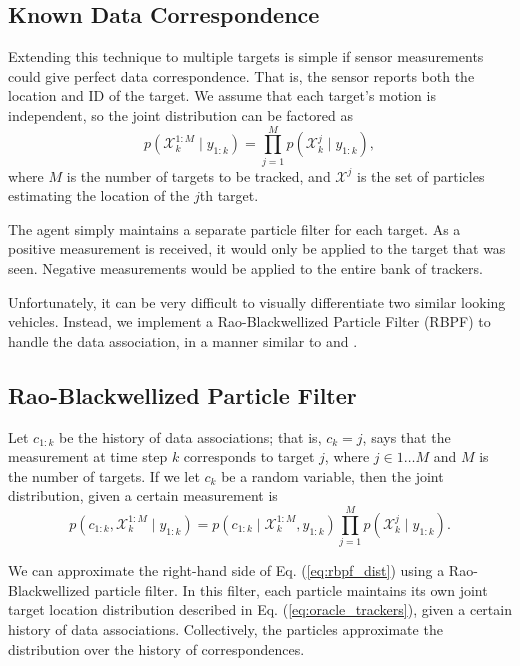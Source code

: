 \documentclass[letterpaper, 10 pt, conference]{ieeeconf}  %
\begin{document}
\subsection{Known Data Correspondence}

Extending this technique to multiple targets is simple if sensor measurements could give perfect data correspondence. That is, the sensor reports both the location and ID of the target. We assume that each target's motion is independent, so the joint distribution can be factored as
\begin{equation}\label{eq:oracle_trackers}
    p(\mathcal{X}^{1:M}_{k} \mid y_{1:k}) = \prod_{j=1}^M p(\mathcal{X}^{j}_{k} \mid y_{1:k}),
\end{equation}
where $M$ is the number of targets to be tracked, and $\mathcal{X}^j$ is the set of particles estimating the location of the $j$th target.

The agent simply maintains a separate particle filter for each target. As a positive measurement is received, it would only be applied to the target that was seen. Negative measurements would be applied to the entire bank of trackers.

Unfortunately, it can be very difficult to visually differentiate two similar looking vehicles. Instead, we implement a Rao-Blackwellized Particle Filter (RBPF) to handle the data association, in a manner similar to \cite{Ahmed2017} and \cite{Sarkka2007}.

\subsection{Rao-Blackwellized Particle Filter}

Let $c_{1:k}$ be the history of data associations; that is, $c_k = j$, says that the measurement at time step $k$ corresponds to target $j$, where $j \in 1 \ldots M$ and $M$ is the number of targets. If we let $c_k$ be a random variable, then the joint distribution, given a certain measurement is
\begin{equation}\label{eq:rbpf_dist}
    p(c_{1:k}, \mathcal{X}^{1:M}_{k} \mid y_{1:k}) = p(c_{1:k} \mid \mathcal{X}^{1:M}_{k}, y_{1:k}) \prod_{j=1}^M p(\mathcal{X}^{j}_{k} \mid y_{1:k}).
\end{equation}

We can approximate the right-hand side of Eq. (\ref{eq:rbpf_dist}) using a Rao-Blackwellized particle filter. In this filter, each particle maintains its own joint target location distribution described in Eq. (\ref{eq:oracle_trackers}), given a certain history of data associations. Collectively, the particles approximate the distribution over the history of correspondences.
\end{document}
